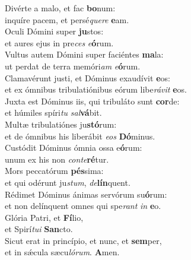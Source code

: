\evenverse Divérte a malo, et fac \textbf{bo}num:~\*\\
\evenverse inquíre pacem, et persé\textit{que}\textit{re} \textbf{e}am.\\
\oddverse Oculi Dómini super \textbf{ju}stos:~\*\\
\oddverse et aures ejus in pre\textit{ces} \textit{e}\textbf{ó}rum.\\
\evenverse Vultus autem Dómini super faciéntes \textbf{ma}la:~\*\\
\evenverse ut perdat de terra memóri\textit{am} \textit{e}\textbf{ó}rum.\\
\oddverse Clamavérunt justi, et Dóminus exaudívit \textbf{e}os:~\*\\
\oddverse et ex ómnibus tribulatiónibus eórum libe\textit{rá}\textit{vit} \textbf{e}os.\\
\evenverse Juxta est Dóminus iis, qui tribuláto sunt \textbf{cor}de:~\*\\
\evenverse et húmiles spíri\textit{tu} \textit{sal}\textbf{vá}bit.\\
\oddverse Multæ tribulatiónes ju\textbf{stó}rum:~\*\\
\oddverse et de ómnibus his liberábit \textit{e}\textit{os} \textbf{Dó}minus.\\
\evenverse Custódit Dóminus ómnia ossa e\textbf{ó}rum:~\*\\
\evenverse unum ex his non \textit{con}\textit{te}\textbf{ré}tur.\\
\oddverse Mors peccatórum \textbf{pés}sima:~\*\\
\oddverse et qui odérunt ju\textit{stum}, \textit{de}\textbf{lín}quent.\\
\evenverse Rédimet Dóminus ánimas servórum su\textbf{ó}rum:~\*\\
\evenverse et non delínquent omnes qui spe\textit{rant} \textit{in} \textbf{e}o.\\
\oddverse Glória Patri, et \textbf{Fí}lio,~\*\\
\oddverse et Spirí\textit{tu}\textit{i} \textbf{San}cto.\\
\evenverse Sicut erat in princípio, et nunc, et \textbf{sem}per,~\*\\
\evenverse et in sǽcula sæcu\textit{ló}\textit{rum}. \textbf{A}men.\\
